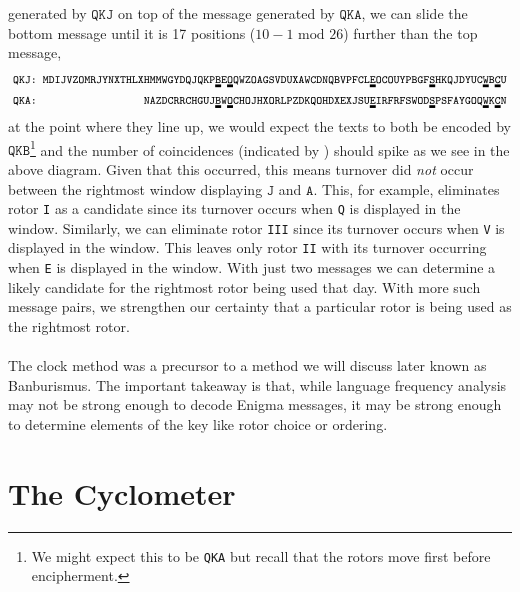 generated by $\texttt{QKJ}$ on top of the message generated by
$\texttt{QKA}$, we can slide the bottom message until it is 17
positions ($10-1 \text{ mod } 26$)
further than the top message,
\begin{align*}
  &\footnotesize\texttt{QKJ:
  MDIJVZOMRJYNXTHLXHMMWGYDQJQKP}\dunderline{2pt}{\texttt{B}}\texttt{E}\dunderline{2pt}{\texttt{O}}\texttt{QWZOAGSVDUXAWCDNQBVPFCL}\dunderline{2pt}{\texttt{E}}\texttt{OCOUYPBGF}\dunderline{2pt}{\texttt{S}}\texttt{HKQJDYUC}\dunderline{2pt}{\texttt{W}}\texttt{B}\dunderline{2pt}{\texttt{C}}\texttt{U}
  \\
  &\footnotesize\texttt{QKA:\ \ \ \ \ \ \ \ \ \ \ \ \ \ \ \ \ \
  NAZDCRRCHGUJ}\dunderline{2pt}{\texttt{B}}\texttt{W}\dunderline{2pt}{\texttt{O}}\texttt{CHOJHXORLPZDKQOHDXEXJSU}\dunderline{2pt}{\texttt{E}}\texttt{IRFRFSWOD}\dunderline{2pt}{\texttt{S}}\texttt{PSFAYGOQ}\dunderline{2pt}{\texttt{W}}\texttt{K}\dunderline{2pt}{\texttt{C}}\texttt{N}
\end{align*}
at the point where they line up, we would expect the texts to both be encoded by
$\texttt{QKB}$\footnote{We might expect this to be \texttt{QKA} but
recall that the rotors move first before encipherment.} and the
number of coincidences (indicated by \dunderline{2pt}{\texttt{ }})
should spike as we see in the above diagram. Given that
this occurred, this means turnover did \emph{not} occur between the
rightmost window displaying $\texttt{J}$ and
$\texttt{A}$. This, for example, eliminates rotor \texttt{I} as a
candidate since its turnover occurs when \texttt{Q} is displayed in
the window. Similarly, we can eliminate rotor \texttt{III} since its
turnover occurs when \texttt{V} is displayed in the window. This
leaves only rotor \texttt{II} with its turnover occurring when
\texttt{E} is displayed in the window. With just two messages we can
determine a likely candidate for the rightmost rotor being used that
day. With more such message pairs, we strengthen our certainty that a
particular rotor is being used as the rightmost rotor.
\\\\The clock method was
a precursor to a method we will discuss later known as Banburismus.
The important takeaway is that, while language frequency analysis may not be
strong enough to decode Enigma messages, it may be strong enough to
determine elements of the key like rotor choice or ordering.

\section{The Cyclometer}\label{cyclometer}


